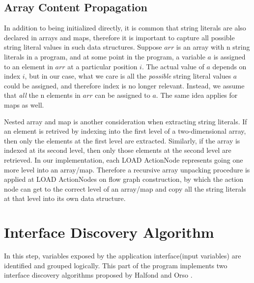 \subsection{Array Content Propagation}
\label{array_prop}
In addition to being initialized directly, it is common that string literals are also declared in arrays and maps, therefore it is important to capture all possible string literal values in such data structures. Suppose $arr$ is an array with n string literals in a program, and at some point in the program, a variable $a$ is assigned to an element in $arr$ at a particular position $i$. The actual value of $a$ depends on index $i$, but in our case, what we care is all the \textit{possible} string literal values $a$ could be assigned, and therefore index is no longer relevant. Instead, we assume that \textit{all} the n elements in $arr$ can be assigned to $a$. The same idea applies for maps as well.

Nested array and map is another consideration when extracting string literals. If an element is retrived by indexing into the first level of a two-dimensional array, then only the elements at the first level are extracted. Similarly, if the array is indexed at its second level, then only those elements at the second level are retrieved. In our implementation, each LOAD ActionNode represents going one more level into an array/map. Therefore a recursive array unpacking procedure is applied at LOAD ActionNodes on flow graph construction, by which the action node can get to the correct level of an array/map and copy all the string literals at that level into its own data structure.


\section{Interface Discovery Algorithm}
In this step, variables exposed by the application interface(input variables) are identified and grouped logically. This part of the program implements two interface discovery algorithms proposed by Halfond and Orso \cite{ref3}.

